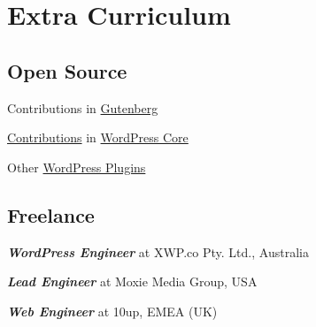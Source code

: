 \documentclass[]{deedy-resume-openfont}
\begin{document}
\begin{minipage}[t]{0.33\textwidth}

\section{Extra Curriculum}

\subsection{Open Source}
\vspace{\topsep} %
\begin{tightemize}
\item Contributions in \href{https://github.com/WordPress/gutenberg/pulls?q=is\%3Apr+author\%3Adesaiuditd}{Gutenberg}
\item \href{https://core.trac.wordpress.org/report/25?USER=desaiuditd}{Contributions} in \href{https://github.com/WordPress/wordpress-develop/pulls?q=is\%3Apr+author\%3Adesaiuditd}{WordPress Core}
\item Other \href{https://profiles.wordpress.org/desaiuditd/#content-plugins}{WordPress Plugins}
\end{tightemize}
\sectionsep


\subsection{Freelance}
\begin{tightemize}
\item \textbf{\textit{WordPress Engineer}} at XWP.co Pty. Ltd., Australia
\end{tightemize}
\begin{tightemize}
\item \textbf{\textit{Lead Engineer}} at Moxie Media Group, USA
\end{tightemize}
\begin{tightemize}
\item \textbf{\textit{Web Engineer}} at 10up, EMEA (UK)
\end{tightemize}
\sectionsep


\end{minipage}
\end{document}
